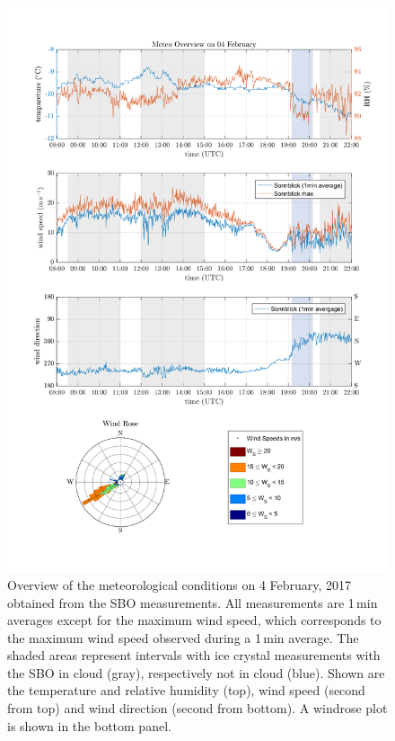 \documentclass[draft,linenumbers]{agujournal}
\begin{document}
\begin{figure}[t]
 \centering
 	\includegraphics[width=14cm]{MeteoOvervire_0402.png}
 \caption{Overview of the meteorological conditions on 4 February, 2017 obtained from the SBO measurements. All measurements are 1\,\si{min} averages except for the maximum wind speed, which corresponds to the maximum wind speed observed during a 1\,\si{min} average. The shaded areas represent intervals with ice crystal measurements with the SBO in cloud (gray), respectively not in cloud (blue). Shown are the temperature and relative humidity (top), wind speed (second from top) and wind direction (second from bottom). A windrose plot is shown in the bottom panel.}
 \label{fig:meteo0402}
\end{figure}
\end{document}
